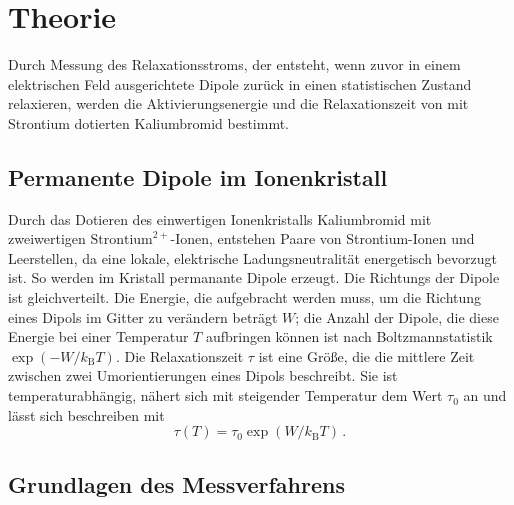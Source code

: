 \section{Theorie}

Durch Messung des Relaxationsstroms, der entsteht, wenn zuvor in einem elektrischen Feld ausgerichtete Dipole zurück in einen statistischen Zustand relaxieren, werden die Aktivierungsenergie und die Relaxationszeit von mit Strontium dotierten Kaliumbromid bestimmt.

\subsection{Permanente Dipole im Ionenkristall}

Durch das Dotieren des einwertigen Ionenkristalls Kaliumbromid mit zweiwertigen $\text{Strontium}^{2+}$-Ionen, entstehen Paare von Strontium-Ionen und Leerstellen, da eine lokale, elektrische Ladungsneutralität energetisch bevorzugt ist. So werden im Kristall permanante Dipole erzeugt. Die Richtungs der Dipole ist gleichverteilt. Die Energie, die aufgebracht werden muss, um die Richtung eines Dipols im Gitter zu verändern beträgt $W$; die Anzahl der Dipole, die diese Energie bei einer Temperatur $T$ aufbringen können ist nach Boltzmannstatistik $\exp \left( -W/k_\text{B}T \right)$. Die Relaxationszeit $\tau$ ist eine Größe, die die mittlere Zeit zwischen zwei Umorientierungen eines Dipols beschreibt. Sie ist temperaturabhängig, nähert sich mit steigender Temperatur dem Wert $\tau_0$ an und lässt sich beschreiben mit
\begin{equation}
  \tau(T) = \tau_0 \exp \left( W/k_\text{B}T \right)\,.
  \label{eq:tau}
\end{equation}

\subsection{Grundlagen des Messverfahrens}

